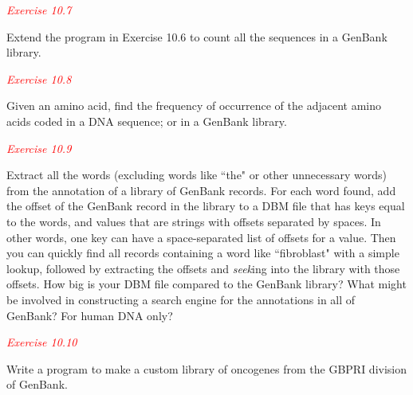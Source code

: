 \textcolor{red}{\textit{Exercise 10.7}}
\begin{adjustwidth}{1cm}{}
Extend the program in Exercise 10.6 to count all the sequences in a GenBank library.
\end{adjustwidth}

\textcolor{red}{\textit{Exercise 10.8}}
\begin{adjustwidth}{1cm}{}
Given an amino acid, find the frequency of occurrence of the adjacent amino acids coded in a DNA sequence; or in a GenBank library.
\end{adjustwidth}

\textcolor{red}{\textit{Exercise 10.9}}
\begin{adjustwidth}{1cm}{}
Extract all the words (excluding words like ``the" or other unnecessary words) from the annotation of a library of GenBank records. For each word found, add the offset of the GenBank record in the library to a DBM file that has keys equal to the words, and values that are strings with offsets separated by spaces. In other words, one key can have a space-separated list of offsets for a value. Then you can quickly find all records containing a word like ``fibroblast" with a simple lookup, followed by extracting the offsets and \textit{seek}ing into the library with those offsets. How big is your DBM file compared to the GenBank library? What might be involved in constructing a search engine for the annotations in all of GenBank? For human DNA only?
\end{adjustwidth}

\textcolor{red}{\textit{Exercise 10.10}}
\begin{adjustwidth}{1cm}{}
Write a program to make a custom library of oncogenes from the GBPRI division of GenBank.
\end{adjustwidth}

